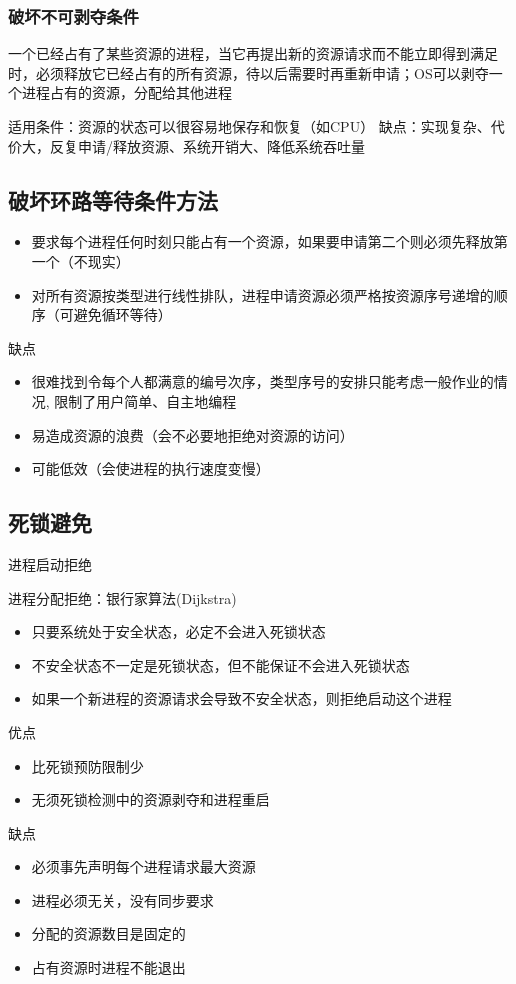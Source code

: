 \subsubsection{破坏不可剥夺条件}
一个已经占有了某些资源的进程，当它再提出新的资源请求而不能立即得到满足时，必须释放它已经占有的所有资源，待以后需要时再重新申请；OS可以剥夺一个进程占有的资源，分配给其他进程

适用条件：资源的状态可以很容易地保存和恢复（如CPU）
缺点：实现复杂、代价大，反复申请/释放资源、系统开销大、降低系统吞吐量

\subsection{破坏环路等待条件方法}
\begin{itemize}
    \item 要求每个进程任何时刻只能占有一个资源，如果要申请第二个则必须先释放第一个（不现实）
    \item 对所有资源按类型进行线性排队，进程申请资源必须严格按资源序号递增的顺序（可避免循环等待）
\end{itemize}

缺点
\begin{itemize}
    \item 很难找到令每个人都满意的编号次序，类型序号的安排只能考虑一般作业的情况, 限制了用户简单、自主地编程
    \item 易造成资源的浪费（会不必要地拒绝对资源的访问）
    \item 可能低效（会使进程的执行速度变慢）
\end{itemize}

\subsection{死锁避免}
进程启动拒绝

进程分配拒绝：银行家算法(Dijkstra)
\begin{itemize}
    \item 只要系统处于安全状态，必定不会进入死锁状态
    \item 不安全状态不一定是死锁状态，但不能保证不会进入死锁状态
    \item 如果一个新进程的资源请求会导致不安全状态，则拒绝启动这个进程
\end{itemize}

优点
\begin{itemize}
    \item 比死锁预防限制少
    \item 无须死锁检测中的资源剥夺和进程重启
\end{itemize}
缺点
\begin{itemize}
    \item 必须事先声明每个进程请求最大资源
    \item 进程必须无关，没有同步要求
    \item 分配的资源数目是固定的
    \item 占有资源时进程不能退出
\end{itemize}

